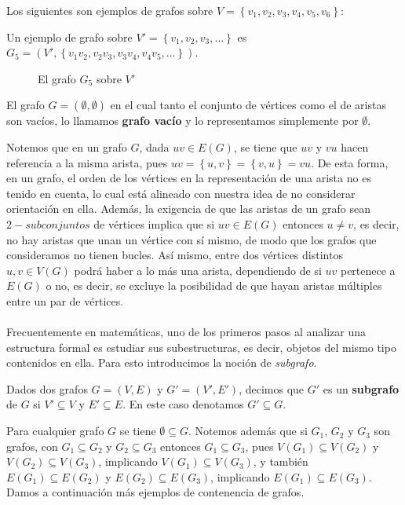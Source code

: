 \begin{Ejm} \label{Ejm:cuatro_grafos}
   Los siguientes son ejemplos de grafos sobre $V=\left\lbrace v_1,v_2,v_3,v_4,v_5, v_6 \right\rbrace$:
  
   Un ejemplo de grafo sobre $V'=\left\lbrace v_1, v_2, v_3, \dots\right\rbrace$ es $G_5=(V',\left\lbrace v_1v_2, v_2v_3, v_3v_4, v_4v_5, \dots\right\rbrace)$.
   \begin{figure}[H]
     \centering
       \resizebox{0.45\textwidth}{!}{} 
     \caption{El grafo $G_5$ sobre $V'$}
   \end{figure}
\end{Ejm}
\begin{Not}
   El grafo $G=(\emptyset,\emptyset)$ en el cual tanto el conjunto de vértices como el de aristas son vacíos, lo llamamos \textbf{grafo vacío} y lo representamos simplemente por $\emptyset$.
\end{Not}
Notemos que en un grafo $G$, dada $uv\in E(G)$, se tiene que $uv$ y $vu$ hacen referencia a la misma arista, pues $uv=\left\lbrace u,v \right\rbrace=\left\lbrace v, u\right\rbrace=vu$. De esta forma, en un grafo, el orden de los vértices en la representación de una arista no es tenido en cuenta, lo cual está alineado con nuestra idea de no considerar orientación en ella. Además, la exigencia de que las aristas de un grafo sean $2-subconjuntos$ de vértices implica que si $uv\in E(G)$ entonces $u\neq v$, es decir, no hay aristas que unan un vértice con sí mismo, de modo que los grafos que consideramos no tienen bucles. Así mismo, entre dos vértices distintos $u,v\in V(G)$ podrá haber a lo más una arista, dependiendo de si $uv$ pertenece a $E(G)$ o no, es decir, se excluye la posibilidad de que hayan aristas múltiples entre un par de vértices.\\\\
Frecuentemente en matemáticas, uno de los primeros pasos al analizar una estructura formal es estudiar sus subestructuras, es decir, objetos del mismo tipo contenidos en ella. Para esto introducimos la noción de \textit{subgrafo}.
\begin{Def}
   Dados dos grafos $G=(V,E)$ y $G'=(V',E')$, decimos que $G'$ es un \textbf{subgrafo} de $G$ si $V'\subseteq V$ y $E'\subseteq E$. En este caso denotamos $G'\subseteq G$.
\end{Def}
Para cualquier grafo $G$ se tiene $\emptyset\subseteq G$. Notemos además que si $G_1$, $G_2$ y $G_3$ son grafos, con $G_1\subseteq G_2$ y $G_2\subseteq G_3$ entonces $G_1\subseteq G_3$, pues $V(G_1)\subseteq V(G_2)$ y $V(G_2)\subseteq V(G_3)$, implicando $V(G_1)\subseteq V(G_3)$, y también $E(G_1)\subseteq E(G_2)$ y $E(G_2)\subseteq E(G_3)$, implicando $E(G_1)\subseteq E(G_3)$.  Damos a continuación más ejemplos de contenencia de grafos.

